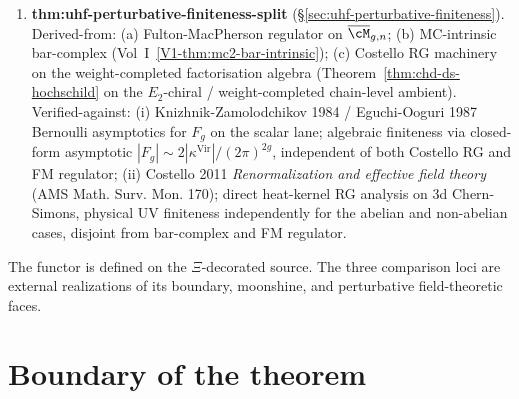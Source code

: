 \begin{enumerate}
\item \textbf{thm:uhf-perturbative-finiteness-split}
 \textup{(}\S\ref{sec:uhf-perturbative-finiteness}\textup{)}.
 Derived-from: \textup{(a)} Fulton-MacPherson regulator on
 $\overline{\cM}_{g,n}$; \textup{(b)} MC-intrinsic bar-complex
 \textup{(}Vol~I~\ref*{V1-thm:mc2-bar-intrinsic}\textup{)};
 \textup{(c)} Costello RG machinery on the weight-completed
 factorisation algebra \textup{(}Theorem~\ref*{thm:chd-ds-hochschild}
 on the $E_2$-chiral / weight-completed chain-level ambient\textup{)}.
 Verified-against: \textup{(i)} Knizhnik-Zamolodchikov 1984 /
 Eguchi-Ooguri 1987 Bernoulli asymptotics for $F_g$ on the
 scalar lane; algebraic finiteness via closed-form asymptotic
 $|F_g| \sim 2|\kappa^{\mathrm{Vir}}| / (2\pi)^{2g}$, independent
 of both Costello RG and FM regulator;
 \textup{(ii)} Costello 2011 \emph{Renormalization and effective
 field theory} (AMS Math. Surv. Mon. 170); direct heat-kernel
 RG analysis on 3d Chern-Simons, physical UV finiteness
 independently for the abelian and non-abelian cases, disjoint
 from bar-complex and FM regulator.
\end{enumerate}

The functor is defined on the \(\Xi\)-decorated source. The three
comparison loci are external realizations of its boundary, moonshine,
and perturbative field-theoretic faces.

\section{Boundary of the theorem}
\label{sec:uhf-not-proved}

